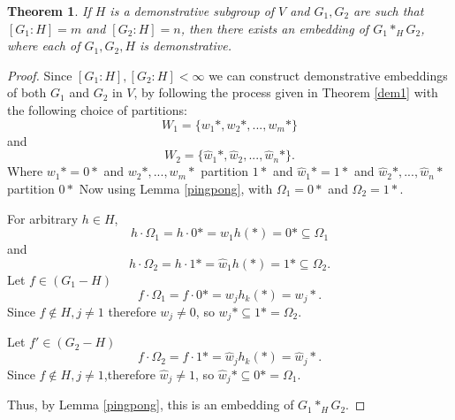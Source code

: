 \documentclass[11pt]{amsart}
\theoremstyle{plain}
\newtheorem{theorem}{Theorem}[section]
\theoremstyle{remark}
\theoremstyle{definition}
\theoremstyle{remark}
\theoremstyle{named}
\begin{document}
\begin{theorem} \label{dem2}
If $H$ is a demonstrative subgroup of $V$ and $G_1, G_2$ are such that $[G_1:H]=m$ and $[G_2:H]=n$, then there exists an embedding of $G_1 *_H G_2$, where each of $G_1,G_2,H$ is demonstrative.
\end{theorem}
\begin{proof}
Since $[G_1:H], [G_2:H] < \infty$ we can construct demonstrative embeddings of both $G_1$ and $G_2$ in $V$, by following the process given in Theorem \ref{dem1} with the following choice of partitions: \[W_1=\{w_1*,w_2*, ..., w_m*\}\]
and 
\[W_2=\{\hat{w}_1*,\hat{w}_2, ..., \hat{w}_n*\}.\]
Where $w_1*=0*$ and $w_2*, ... , w_m*$ partition $1*$ and $\hat{w}_1*=1*$ and $\hat{w}_2*, ... , \hat{w}_n*$ partition $0*$
Now using Lemma \ref{pingpong}, with $\Omega_1=0*$ and $\Omega_2=1*$. 

For arbitrary $h \in H$, 
\[h\cdot \Omega_1=h \cdot 0*=w_1h(*)=0* \subseteq \Omega_1\]
and 
\[h \cdot \Omega_2=h \cdot 1*=\hat{w}_1h(*)=1* \subseteq \Omega_2\text{.}\]
Let $f \in (G_1-H)$
\[f \cdot \Omega_1=f\cdot 0*=w_jh_k(*) = w_j*\text{.}\]
Since $f \notin H, j \not= 1$ therefore $w_j \not= 0$, so $w_j* \subseteq 1* = \Omega_2$.

Let $f' \in (G_2-H)$
\[f \cdot \Omega_2=f \cdot 1*=\hat{w}_jh_k(*)= \hat{w}_j* \text{.}\]
Since $f \notin H, j\not= 1$,therefore $\hat{w}_j \not=1$, so $\hat{w}_j* \subseteq 0* = \Omega_1$.

Thus, by Lemma \ref{pingpong}, this is an embedding of $G_1 *_H G_2$.
\end{proof}
\end{document}
